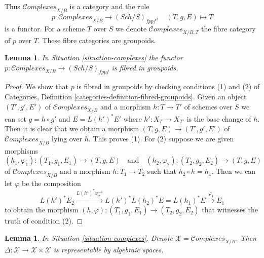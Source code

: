 \documentclass[10pt,a4paper]{amsart}
\theoremstyle{plain}
\newtheorem{lemma}[subsection]{Lemma}
\theoremstyle{definition}
\theoremstyle{remark}
\numberwithin{equation}{subsection}
\def\Sch{\mathit{Sch}}
\def\Complexesstack{\mathcal{C}\!\mathit{omplexes}}
\begin{document}
\noindent
Thus $\Complexesstack_{X/B}$ is a category and the rule
$$
p : \Complexesstack_{X/B} \longrightarrow (\Sch/S)_{fppf},
\quad
(T, g, E) \longmapsto T
$$
is a functor. For a scheme $T$ over $S$ we denote $\Complexesstack_{X/B, T}$
the fibre category of $p$ over $T$. These fibre categories are groupoids.

\begin{lemma}
\label{lemma-complexes-fibred-in-groupoids}
In Situation \ref{situation-complexes} the functor
$p : \Complexesstack_{X/B} \longrightarrow (\Sch/S)_{fppf}$
is fibred in groupoids.
\end{lemma}

\begin{proof}
We show that $p$ is fibred in groupoids by checking conditions
(1) and (2) of Categories, Definition
\ref{categories-definition-fibred-groupoids}.
Given an object $(T', g', E')$
of $\Complexesstack_{X/B}$ and a morphism $h : T \to T'$ of
schemes over $S$ we can set $g = h \circ g'$ and
$E = L(h')^*E'$ where $h' : X_T \to X_{T'}$
is the base change of $h$. Then it is clear that we obtain
a morphism $(T, g, E) \to (T', g', E')$
of $\Complexesstack_{X/B}$ lying over $h$. This proves (1).
For (2) suppose we are given morphisms
$$
(h_1, \varphi_1) : (T_1, g_1, E_1) \to (T, g, E)
\quad\text{and}\quad
(h_2, \varphi_2) : (T_2, g_2, E_2) \to (T, g, E)
$$
of $\Complexesstack_{X/B}$ and a morphism $h : T_1 \to T_2$ such that
$h_2 \circ h = h_1$. Then we can let $\varphi$ be the composition
$$
L(h')^*E_2
\xrightarrow{L(h')^*\varphi_2^{-1}}
L(h')^*L(h_2)^*E = L(h_1)^*E
\xrightarrow{\varphi_1}
E_1
$$
to obtain the morphism
$(h, \varphi) : (T_1, g_1, E_1) \to (T_2, g_2, E_2)$
that witnesses the truth of condition (2).
\end{proof}

\begin{lemma}
\label{lemma-complexes-diagonal}
In Situation \ref{situation-complexes}. Denote
$\mathcal{X} = \Complexesstack_{X/B}$. Then
$\Delta : \mathcal{X} \to \mathcal{X} \times \mathcal{X}$ is
representable by algebraic spaces.
\end{lemma}
\end{document}
